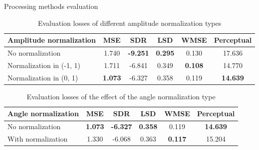 \documentclass{beamer}
\begin{document}
\begin{frame}{Processing methods evaluation}
    \vspace{-1.5\baselineskip}
    \begin{table}
        \centering
        \small
        \caption{Evaluation losses of different amplitude normalization types}
        \label{Evaluation losses of the amplitude normalization types comparison in the case of no angle normalization}
        \vspace{-0.6cm}
        \begin{tabular}{l|c|c|c|c|c}
            \hline
            Amplitude normalization & MSE & SDR & LSD & WMSE & Perceptual \\
            \hline
            No normalization & 1.740 & \textbf{-9.251} & \textbf{0.295} & 0.130 & 17.636 \\
            \hline
            Normalization in (-1, 1) & 1.711 & -6.841 & 0.349 & \textbf{0.108} & 14.770 \\
            \hline
            Normalization in (0, 1) & \textbf{1.073} & -6.327 & 0.358 & 0.119 & \textbf{14.639} \\
            \hline
        \end{tabular}
    \end{table}

    \vspace{0.5\baselineskip}

    \begin{table}
        \centering
        \caption{Evaluation losses of the effect of the angle normalization type}
        \label{Evaluation losses of the angle normalization types comparison}
        \vspace{-0.65cm}
        \begin{tabular}{l|c|c|c|c|c}
            \hline
            Angle normalization & MSE & SDR & LSD & WMSE & Perceptual \\
            \hline
            No normalization & \textbf{1.073} & \textbf{-6.327} & \textbf{0.358} & 0.119 & \textbf{14.639} \\
            \hline
            With normalization & 1.330 & -6.068 & 0.363 & \textbf{0.117} & 15.204 \\
            \hline
        \end{tabular}
    \end{table}
\end{frame}
\end{document}
